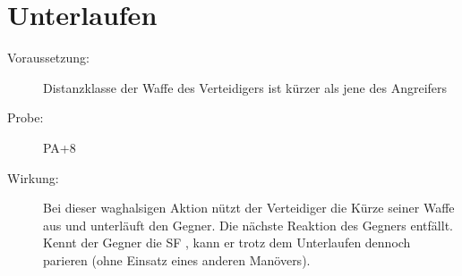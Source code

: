 \section{Unterlaufen}
\label{reaktion.unterlaufen}
\begin{description}
    \item[Voraussetzung:]
        Distanzklasse der Waffe des Verteidigers ist kürzer als jene des Angreifers
    \item[Probe:]
        PA+8
    \item[Wirkung:]
        Bei dieser waghalsigen Aktion nützt der Verteidiger die Kürze seiner Waffe aus und unterläuft den Gegner.
        Die nächste Reaktion des Gegners entfällt.
        Kennt der Gegner die SF , kann er trotz dem Unterlaufen dennoch parieren (ohne Einsatz eines anderen Manövers).
\end{description}
